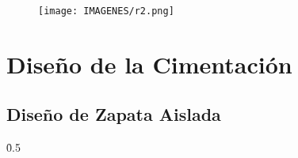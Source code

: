 \maketitle
\begin{figure}[h!]
    \centering
    \texttt{[image: IMAGENES/r2.png]}
    \label{fig:my_label}
\end{figure}
\thispagestyle{empty}
\newpage

\clearpage                       %
{                                %
  \pagestyle{empty}              %
  {
    \fancyhf{}%
    \renewcommand{\headrulewidth}{0pt}%
    \renewcommand{\footrulewidth}{0pt}%
  }
    \begin{spacing}{1.35}
    \tableofcontents
  \end{spacing}
  \thispagestyle{empty}  
  \listoffigures
\newpage
\listoftables
  \thispagestyle{empty} 
}


\newpage





\newpage
\section{Diseño de la Cimentación}

\subsection{Diseño de Zapata Aislada}

\FPset{} %
\FPset{}
\FPset{}
\FPset{}
\FPset{}
\FPset\h{0.5}

\FPset{} %
\FPset{} %
\FPset{} %
\FPset{} %
\FPset{} %
\FPset{} %
\FPset{} %
\FPset{} %
\FPset{} %
\FPset{} %

